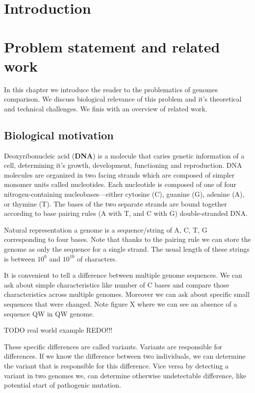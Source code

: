 \chapter*{Introduction}


\chapter{Problem statement and related work}
In this chapter we introduce the reader to the problematics of genomes comparison. 
We discuss biological relevance of this problem and it's theoretical and technical challenges. 
We finis with an overview of related work.

\section{Biological motivation}

Deoxyribonucleic acid (\textbf{DNA}) is a molecule that caries genetic information of a cell, 
determining it's growth, development, functioning and reproduction. 
DNA molecules are organized in two facing strands which are composed of simpler monomer units called nucleotides.
Each nucleotide is composed of one of four nitrogen-containing nucleobases—either cytosine (C), guanine (G), adenine (A), or thymine (T).
The bases of the two separate strands are bound together according to base pairing rules (A with T, and C with G) double-stranded DNA. 

Natural representation a genome is a sequence/string of A, C, T, G corresponding to four bases. 
Note that thanks to the pairing rule we can store the genome as only the sequence for a single strand. 
The usual length of these strings is between $10^6$ and $10^10$
of characters.

It is convenient to tell a difference between multiple genome sequences. We can ask about simple characteristics like number of C bases and compare those characteristics across multiple genomes. Moreover we can ask about specific small sequences that were changed. Note figure X where we can see an absence of a sequence QW in QW genome.  

TODO real world example REDO!!!

These specific differences are called variants. 
Variants are responsible for differences. 
If we know the difference between two individuals, we can determine the variant that is responsible for this difference. 
Vice versa by detecting a variant in two genomes we, can determine otherwise undetectable difference, 
like potential start of pathogenic mutation.


